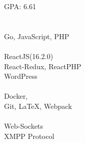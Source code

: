 \documentclass[]{hemant-style}
\begin{document}
\begin{minipage}[]{\textwidth}
\begin{minipage}{\textwidth}
\begin{minipage}[t][][c]{.25\textwidth}
                            GPA: 6.61\\
                             \newline
                             \\
                            \\
                            Go, 
                            JavaScript, PHP\\
                            \\
                            ReactJS(16.2.0) \\React-Redux, ReactPHP\\
                            WordPress\\
                            \\
                            Docker, \\
                            Git, \LaTeX, Webpack\\
                            \\
                            Web-Sockets \\XMPP Protocol\\
                            \vspace{1em}
                        \end{minipage}
                        \begin{minipage}[t][][c]{.75\textwidth}
                             \\

\end{minipage}
\end{minipage}
\end{minipage}
\end{document}
